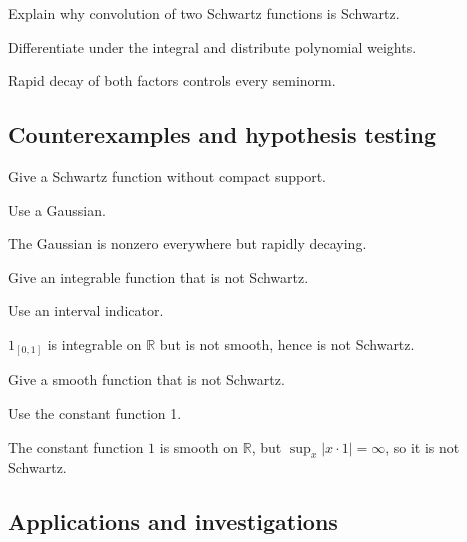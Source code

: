 \begin{exercise}\label{exr:iii14-expand-09}
Explain why convolution of two Schwartz functions is Schwartz.
\end{exercise}
\begin{hint}
Differentiate under the integral and distribute polynomial weights.
\end{hint}
\begin{solution}
Rapid decay of both factors controls every seminorm.
\end{solution}

\subsection*{Counterexamples and hypothesis testing}

\begin{exercise}\label{exr:iii14-expand-10}
Give a Schwartz function without compact support.
\end{exercise}
\begin{hint}
Use a Gaussian.
\end{hint}
\begin{solution}
The Gaussian is nonzero everywhere but rapidly decaying.
\end{solution}

\begin{exercise}\label{exr:iii14-expand-11}
Give an integrable function that is not Schwartz.
\end{exercise}
\begin{hint}
Use an interval indicator.
\end{hint}
\begin{solution}
$1_{[0,1]}$ is integrable on $\mathbb R$ but is not smooth, hence is not Schwartz.
\end{solution}

\begin{exercise}\label{exr:iii14-expand-12}
Give a smooth function that is not Schwartz.
\end{exercise}
\begin{hint}
Use the constant function 1.
\end{hint}
\begin{solution}
The constant function $1$ is smooth on $\mathbb R$, but $\sup_x|x\cdot1|=\infty$, so it is not Schwartz.
\end{solution}

\subsection*{Applications and investigations}

